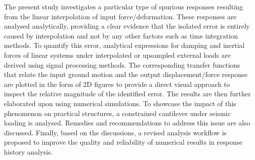 The present study investigates a particular type of spurious responses resulting from the linear interpolation of input force/deformation. These responses are analysed analytically, providing a clear evidence that the isolated error is entirely caused by interpolation and not by any other factors such as time integration methods. To quantify this error, analytical expressions for damping and inertial forces of linear systems under interpolated or upsampled external loads are derived using signal processing methods. The corresponding transfer functions that relate the input ground motion and the output displacement/force response are plotted in the form of 2D figures to provide a direct visual approach to inspect the relative magnitude of the identified error. The results are then further elaborated upon using numerical simulations. To showcase the impact of this phenomenon on practical structures, a constrained cantilever under seismic loading is analysed. Remedies and recommendations to address this issue are also discussed. Finally, based on the discussions, a revised analysis workflow is proposed to improve the quality and reliability of numerical results in response history analysis.